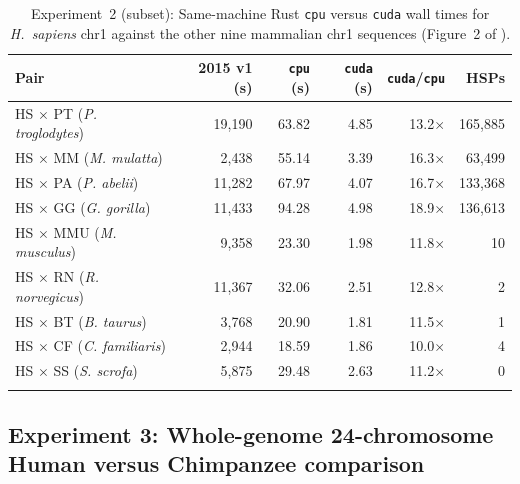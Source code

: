 \documentclass[pdflatex,sn-vancouver,Numbered]{sn-jnl}
\newcommand{\eTwoHsPtCpu}{63.82}  \newcommand{\eTwoHsPtCuda}{4.85}  \newcommand{\eTwoHsPtSp}{13.2$\times$}  \newcommand{\eTwoHsPtFrags}{165,885}
\newcommand{\eTwoHsMmCpu}{55.14}  \newcommand{\eTwoHsMmCuda}{3.39}  \newcommand{\eTwoHsMmSp}{16.3$\times$}  \newcommand{\eTwoHsMmFrags}{63,499}
\newcommand{\eTwoHsPaCpu}{67.97}  \newcommand{\eTwoHsPaCuda}{4.07}  \newcommand{\eTwoHsPaSp}{16.7$\times$}  \newcommand{\eTwoHsPaFrags}{133,368}
\newcommand{\eTwoHsGgCpu}{94.28}  \newcommand{\eTwoHsGgCuda}{4.98}  \newcommand{\eTwoHsGgSp}{18.9$\times$}  \newcommand{\eTwoHsGgFrags}{136,613}
\newcommand{\eTwoHsMmuCpu}{23.30} \newcommand{\eTwoHsMmuCuda}{1.98} \newcommand{\eTwoHsMmuSp}{11.8$\times$} \newcommand{\eTwoHsMmuFrags}{10}
\newcommand{\eTwoHsRnCpu}{32.06}  \newcommand{\eTwoHsRnCuda}{2.51}  \newcommand{\eTwoHsRnSp}{12.8$\times$}  \newcommand{\eTwoHsRnFrags}{2}
\newcommand{\eTwoHsBtCpu}{20.90}  \newcommand{\eTwoHsBtCuda}{1.81}  \newcommand{\eTwoHsBtSp}{11.5$\times$}  \newcommand{\eTwoHsBtFrags}{1}
\newcommand{\eTwoHsCfCpu}{18.59}  \newcommand{\eTwoHsCfCuda}{1.86}  \newcommand{\eTwoHsCfSp}{10.0$\times$}  \newcommand{\eTwoHsCfFrags}{4}
\newcommand{\eTwoHsSsCpu}{29.48}  \newcommand{\eTwoHsSsCuda}{2.63}  \newcommand{\eTwoHsSsSp}{11.2$\times$}  \newcommand{\eTwoHsSsFrags}{0}
\begin{document}
\begin{table}[ht]
\centering
\footnotesize
\setlength{\tabcolsep}{3pt}
\caption{Experiment~2 (subset): Same-machine Rust \texttt{cpu} versus \texttt{cuda} wall times for \textit{H.~sapiens} chr1 against the other nine mammalian chr1 sequences (Figure~2 of \cite{torreno2015gecko}).}\label{tab:exp2_hs}
\begin{tabular*}{\textwidth}{@{\extracolsep\fill}lrrrrr}
\toprule
Pair & 2015 v1 (s) & \texttt{cpu} (s) & \texttt{cuda} (s) & \texttt{cuda}/\texttt{cpu} & HSPs \\
\midrule
HS $\times$ PT (\textit{P. troglodytes}) & 19,190 & \eTwoHsPtCpu  & \eTwoHsPtCuda  & \eTwoHsPtSp  & \eTwoHsPtFrags \\
HS $\times$ MM (\textit{M. mulatta})     &  2,438 & \eTwoHsMmCpu  & \eTwoHsMmCuda  & \eTwoHsMmSp  & \eTwoHsMmFrags \\
HS $\times$ PA (\textit{P. abelii})      & 11,282 & \eTwoHsPaCpu  & \eTwoHsPaCuda  & \eTwoHsPaSp  & \eTwoHsPaFrags \\
HS $\times$ GG (\textit{G. gorilla})     & 11,433 & \eTwoHsGgCpu  & \eTwoHsGgCuda  & \eTwoHsGgSp  & \eTwoHsGgFrags \\
HS $\times$ MMU (\textit{M. musculus})   &  9,358 & \eTwoHsMmuCpu & \eTwoHsMmuCuda & \eTwoHsMmuSp & \eTwoHsMmuFrags \\
HS $\times$ RN (\textit{R. norvegicus})  & 11,367 & \eTwoHsRnCpu  & \eTwoHsRnCuda  & \eTwoHsRnSp  & \eTwoHsRnFrags \\
HS $\times$ BT (\textit{B. taurus})      &  3,768 & \eTwoHsBtCpu  & \eTwoHsBtCuda  & \eTwoHsBtSp  & \eTwoHsBtFrags \\
HS $\times$ CF (\textit{C. familiaris})  &  2,944 & \eTwoHsCfCpu  & \eTwoHsCfCuda  & \eTwoHsCfSp  & \eTwoHsCfFrags \\
HS $\times$ SS (\textit{S. scrofa})      &  5,875 & \eTwoHsSsCpu  & \eTwoHsSsCuda  & \eTwoHsSsSp  & \eTwoHsSsFrags \\
\botrule
\end{tabular*}
\end{table}

\subsection{Experiment 3: Whole-genome 24-chromosome Human versus Chimpanzee comparison}\label{subsec:exp3}
\end{document}
